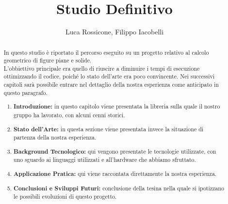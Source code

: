 \documentclass[a4paper]{extreport}
\title{\Huge Studio Definitivo}
\author{Luca Rossicone, Filippo Iacobelli}
\begin{document}
\maketitle
\large
\begin{abstract}
    In questo studio è riportato il percorso eseguito su un progetto relativo al calcolo 
    geometrico di figure piane e solide.\\
    L'obbiettivo principale era quello di riuscire a diminuire i tempi di esecuzione ottimizzando
    il codice, poiché lo stato dell'arte era poco convincente.
    Nei successivi capitoli sarà possibile entrare nel dettaglio della nostra esperienza come 
    anticipato in questo paragrafo.
    \begin{enumerate}
        \item \textbf{Introduzione:} in questo capitolo viene presentata la libreria sulla quale il nostro gruppo ha lavorato, con alcuni cenni storici.
        \item \textbf{Stato dell'Arte:} in questa sezione viene presentata invece la situazione di partenza della nostra esperienza.
        \item \textbf{Background Tecnologico:} qui vengono presentate le tecnologie utilizzate, con uno sguardo ai linguaggi utilizzati e all'hardware che abbiamo sfruttato.
        \item \textbf{Applicazione Pratica:} qui viene raccontata direttamente la nostra esperienza.
        \item \textbf{Conclusioni e Sviluppi Futuri:} conclusione della tesina nella quale si ipotizzano le possibili evoluzioni di questo progetto.
    \end{enumerate}
\end{abstract}
\tableofcontents
\newpage
\end{document}
